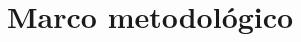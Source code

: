 \documentclass[a4paper, 11pt, twoside]{book}
\begin{document}

               



        \part{Marco metodológico}

        

            

            
        
\end{document}
